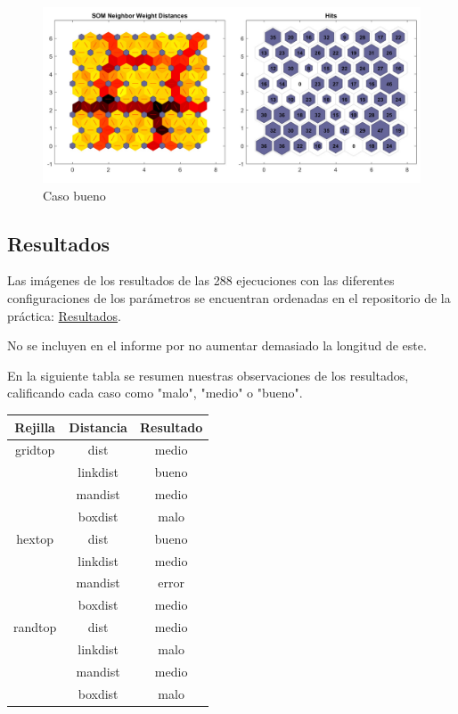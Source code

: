 \documentclass[a4paper,12pt,titlepage]{article}
\begin{document}
\begin{figure}[!ht]
	\centering
	\label{fig:patternnet}
	\includegraphics[width=\textwidth]{caso-bueno.jpg}
	\caption{Caso bueno}
\end{figure}

\subsection{Resultados}

Las imágenes de los resultados de las 288 ejecuciones con las diferentes configuraciones de los parámetros se encuentran ordenadas en el repositorio de la práctica: \href{https://github.com/davidmigloz/neuronal-networks/tree/master/P2\_SelfOrganizingMap/img}{Resultados}.

No se incluyen en el informe por no aumentar demasiado la longitud de este.

En la siguiente tabla se resumen nuestras observaciones de los resultados, calificando cada caso como "malo", "medio" o "bueno".

\begin{tabular}{*3c}
\toprule
Rejilla & Distancia & Resultado \\ 
\midrule
gridtop & dist & medio \\ 
        & linkdist & bueno \\ 
        & mandist & medio \\ 
	      & boxdist & malo \\ 
hextop & dist & bueno \\ 
       & linkdist & medio \\ 
	     & mandist & error \\ 
			 & boxdist & medio \\ 
randtop & dist & medio \\ 
   	 	  & linkdist & malo \\ 
				& mandist & medio \\ 
				& boxdist & malo \\ 
\bottomrule
\end{tabular} 
\end{document}
